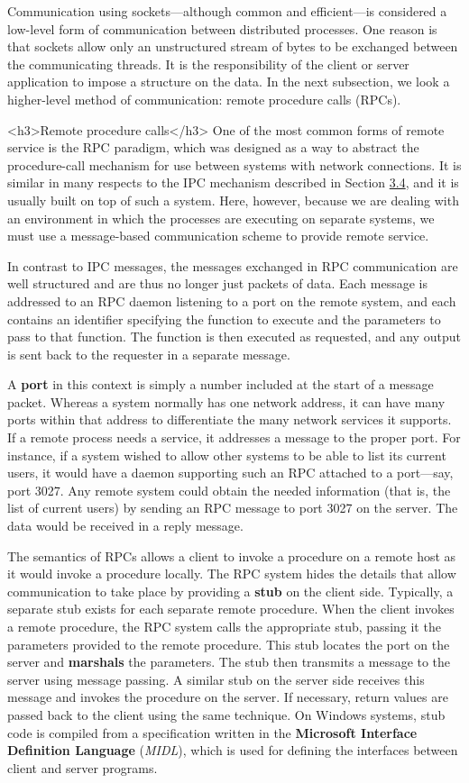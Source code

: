 Communication using sockets---although common and efficient---is considered a low-level form of communication between distributed processes. One reason is that sockets allow only an unstructured stream of bytes to be exchanged between the communicating threads. It is the responsibility of the client or server application to impose a structure on the data. In the next subsection, we look a higher-level method of communication: remote procedure calls (RPCs).

<h3>Remote procedure calls</h3>
One of the most common forms of remote service is the RPC paradigm, which was designed as a way to abstract the procedure-call mechanism for use between systems with network connections. It is similar in many respects to the IPC mechanism described in Section \hyperref[sec:3.4]{3.4}, and it is usually built on top of such a system. Here, however, because we are dealing with an environment in which the processes are executing on separate systems, we must use a message-based communication scheme to provide remote service.

In contrast to IPC messages, the messages exchanged in RPC communication are well structured and are thus no longer just packets of data. Each message is addressed to an RPC daemon listening to a port on the remote system, and each contains an identifier specifying the function to execute and the parameters to pass to that function. The function is then executed as requested, and any output is sent back to the requester in a separate message.

A \textbf{port} in this context is simply a number included at the start of a message packet. Whereas a system normally has one network address, it can have many ports within that address to differentiate the many network services it supports. If a remote process needs a service, it addresses a message to the proper port. For instance, if a system wished to allow other systems to be able to list its current users, it would have a daemon supporting such an RPC attached to a port---say, port 3027. Any remote system could obtain the needed information (that is, the list of current users) by sending an RPC message to port 3027 on the server. The data would be received in a reply message.

The semantics of RPCs allows a client to invoke a procedure on a remote host as it would invoke a procedure locally. The RPC system hides the details that allow communication to take place by providing a \textbf{stub} on the client side. Typically, a separate stub exists for each separate remote procedure. When the client invokes a remote procedure, the RPC system calls the appropriate stub, passing it the parameters provided to the remote procedure. This stub locates the port on the server and \textbf{marshals} the parameters. The stub then transmits a message to the server using message passing. A similar stub on the server side receives this message and invokes the procedure on the server. If necessary, return values are passed back to the client using the same technique. On Windows systems, stub code is compiled from a specification written in the \textbf{Microsoft Interface Definition Language} (\textit{MIDL}), which is used for defining the interfaces between client and server programs.

